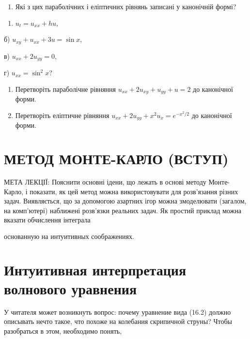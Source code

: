 \documentclass[
  ukrainian,
]{article}
\providecommand{\tightlist}{%
  \setlength{\itemsep}{0pt}\setlength{\parskip}{0pt}}
\begin{document}
\begin{enumerate}
\def\labelenumi{\arabic{enumi}.}
\tightlist
\item
  Які з цих параболічних і еліптичних рівнянь записані у канонічній
  формі?
\end{enumerate}

\begin{enumerate}
\def\labelenumi{\alph{enumi})}
\tightlist
\item
  \(u_t = u_{xx} + hu\),
\end{enumerate}

б) \(u_{xy} + u_{xx} + 3u = \sin x\),

в) \(u_{xx} + 2u_{yy} = 0\),

г) \(u_{xx} = \sin^2 x\)?

\begin{enumerate}
\def\labelenumi{\arabic{enumi}.}
\setcounter{enumi}{1}
\item
  Перетворіть параболічне рівняння \(u_{xx} + 2u_{xy} + u_{yy} + u = 2\)
  до канонічної форми.
\item
  Перетворіть еліптичне рівняння
  \(u_{xx} + 2u_{yy} + x^2 u_x = e^{-x^2/2}\) до канонічної форми.
\end{enumerate}

\section{МЕТОД МОНТЕ-КАРЛО
(ВСТУП)}\label{ux43cux435ux442ux43eux434-ux43cux43eux43dux442ux435-ux43aux430ux440ux43bux43e-ux432ux441ux442ux443ux43f}

МЕТА ЛЕКЦІЇ: Пояснити основні ідени, що лежать в основі методу
Монте-Карло, і показати, як цей метод можна використовувати для
розв'язання різних задач. Виявляється, що за допомогою азартних ігор
можна змоделювати (загалом, на комп'ютері) наближені розв'язки реальних
задач. Як простий приклад можна вказати обчислення інтеграла

основанную на интуитивных соображениях.

\section{Интуитивная интерпретация волнового
уравнения}\label{ux438ux43dux442ux443ux438ux442ux438ux432ux43dux430ux44f-ux438ux43dux442ux435ux440ux43fux440ux435ux442ux430ux446ux438ux44f-ux432ux43eux43bux43dux43eux432ux43eux433ux43e-ux443ux440ux430ux432ux43dux435ux43dux438ux44f}

У читателя может возникнуть вопрос: почему уравнение вида (16.2) должно
описывать нечто такое, что похоже на колебания скрипичной струны? Чтобы
разобраться в этом, необходимо понять,
\end{document}
